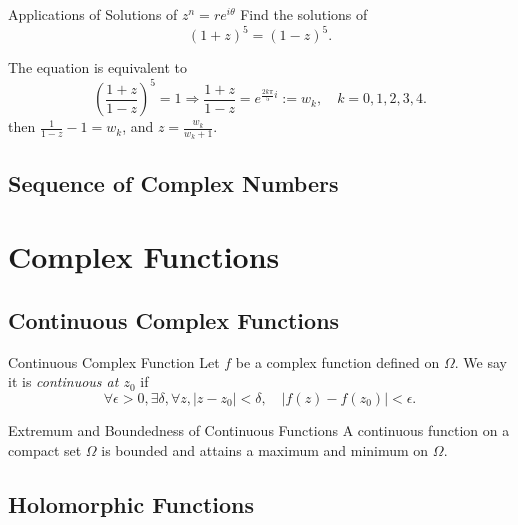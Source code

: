 \begin{example}{Applications of Solutions of $z^n = re^{i\theta}$}{}
  Find the solutions of
  \begin{equation}
    (1+z)^5 = (1-z)^5.
  \end{equation}
\end{example}

\begin{solution}
  The equation is equivalent to 
  \begin{equation}
    \left( \frac{1+z}{1-z} \right)^5 = 1 \Rightarrow
    \frac{1+z}{1-z} = e^{\frac{2k\pi}{5}i} := w_k, \quad k = 0,1,2,3,4.
  \end{equation}
  then $\frac{1}{1-z} - 1 = w_k$, and $z = \frac{w_k}{w_k + 1}$.
\end{solution}

\subsection{Sequence of Complex Numbers}

\section{Complex Functions}

\subsection{Continuous Complex Functions}

\begin{definition}{Continuous Complex Function}{}
  Let $f$ be a complex function defined on $\Omega$.
  We say it is \emph{continuous at $z_0$} if
  \begin{equation}
    \forall \epsilon > 0, \exists \delta, \forall z, |z - z_0| < \delta,
    \quad |f(z) - f(z_0)| < \epsilon.
  \end{equation}
\end{definition}

\begin{theorem}{Extremum and Boundedness of Continuous Functions}{}
  A continuous function on a compact set $\Omega$ is bounded and
  attains a maximum and minimum on $\Omega$.
\end{theorem}

\subsection{Holomorphic Functions}


